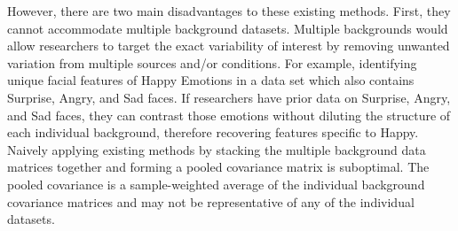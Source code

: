 \documentclass[12pt]{article}
\begin{document}
   
   However, there are two main disadvantages to these existing methods. First, they cannot accommodate multiple background datasets. Multiple backgrounds would allow researchers to target the exact variability of interest by removing unwanted variation from multiple sources and/or conditions. 
   For example, identifying unique facial features of Happy Emotions in a data set which also contains Surprise, Angry, and Sad faces. If researchers have prior data on Surprise, Angry, and Sad faces, they can contrast those emotions without diluting the structure of each individual background, therefore recovering features specific to Happy.
   Naively applying existing methods by stacking the multiple background data matrices together and forming a pooled covariance matrix is suboptimal. The pooled covariance is a sample-weighted average of the individual background covariance matrices and may not be representative of any of the individual datasets. %
   
\end{document}
